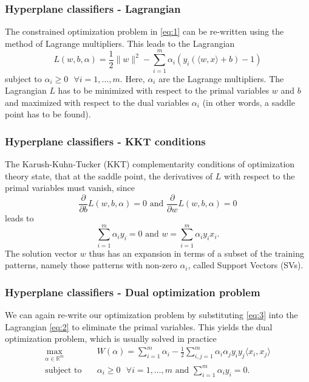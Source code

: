 \documentclass{beamer}
\begin{document}
\begin{frame}{}
    \frametitle{Hyperplane classifiers - Lagrangian}
    The constrained optimization problem in \eqref{eq:1} can be re-written using the method of Lagrange multipliers. This leads to the Lagrangian
    \begin{equation} \label{eq:2}
        L(w,b,\alpha) = \frac{1}{2} \lVert w \rVert^2 - \sum_{i=1}^{m} \alpha_i \left( y_{i} \left( \langle w,x \rangle + b \right) - 1 \right)
    \end{equation}
    subject to $\alpha_i \geq 0 \text{ } \forall i = {1, \dots, m}$. Here, $\alpha_i$ are the Lagrange multipliers. The Lagrangian $L$ has to be minimized with respect to the primal variables $w$ and $b$ and maximized with respect to the dual variables $\alpha_i$ (in other words, a saddle point has to be found).
\end{frame}


\begin{frame}{}
    \frametitle{Hyperplane classifiers - KKT conditions}
    The Karush-Kuhn-Tucker (KKT) complementarity conditions of optimization theory state, that at the saddle point, the derivatives of $L$ with respect to the
    primal variables must vanish, since
    \begin{equation}
        \frac{\partial}{\partial b} L(w,b,\alpha) = 0 \text{ and } \frac{\partial}{\partial w} L(w,b,\alpha) = 0
    \end{equation}
    leads to
    \begin{equation} \label{eq:3}
        \sum_{i=1}^{m} \alpha_i y_i = 0 \text{ and } w = \sum_{i=1}^{m} \alpha_i y_i x_i.
    \end{equation}
    The solution vector $w$ thus has an expansion in terms of a subset of the training patterns, namely those patterns with non-zero $\alpha_i$, called Support Vectors (SVs).
\end{frame}


\begin{frame}{}
    \frametitle{Hyperplane classifiers - Dual optimization problem}
    We can again re-write our optimization problem by substituting \eqref{eq:3} into the Lagrangian \eqref{eq:2} to eliminate the primal variables. This yields the dual optimization problem, which is usually solved in practice
    \begin{equation} \label{eq:4}
        \begin{aligned}
            \max_{\alpha \in \mathbb{R}^m} \quad & W(\alpha) = \sum_{i=1}^{m} \alpha_i - \frac{1}{2} \sum_{i,j=1}^{m} \alpha_i \alpha_j y_i y_j \langle x_i,x_j \rangle \\
            \textrm{subject to} \quad & \alpha_i \geq 0 \text{ } \forall i = {1, \dots, m} \text{ and } \sum_{i=1}^{m} \alpha_i y_i = 0. 
        \end{aligned}
    \end{equation}
\end{frame}
\end{document}
